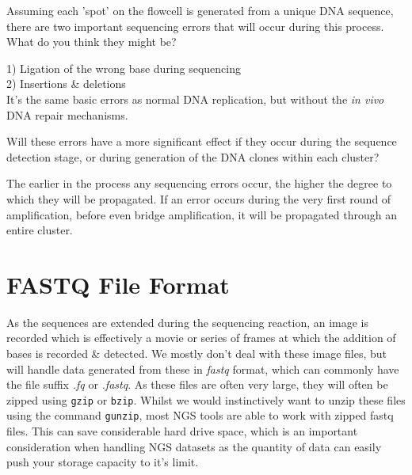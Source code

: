 \begin{questions}
Assuming each 'spot' on the flowcell is generated from a unique DNA sequence, there are two important sequencing errors that will occur during this process.
What do you think they might be? \\
\begin{answer}
1) Ligation of the wrong base during sequencing \\
2) Insertions \& deletions \\
It's the same basic errors as normal DNA replication, but without the \textit{in vivo} DNA repair mechanisms.
\end{answer}

Will these errors have a more significant effect if they occur during the sequence detection stage, or during generation of the DNA clones within each cluster? \\
\begin{answer}
The earlier in the process any sequencing errors occur, the higher the degree to which they will be propagated.
If an error occurs during the very first round of amplification, before even bridge amplification, it will be propagated through an entire cluster. \\
\end{answer}
\end{questions}

\section{FASTQ File Format}
\begin{note}
As the sequences are extended during the sequencing reaction, an image is recorded which is effectively a movie or series of frames at which the addition of bases is recorded \& detected.
We mostly don't deal with these image files, but will handle data generated from these in \textit{fastq} format, which can commonly have the file suffix \textit{.fq} or \textit{.fastq}.
As these files are often very large, they will often be zipped using \texttt{gzip} or \texttt{bzip}.
Whilst we would instinctively want to unzip these files using the command \texttt{gunzip}, most NGS tools are able to work with zipped fastq files.
This can save considerable hard drive space, which is an important consideration when handling NGS datasets as the quantity of data can easily push your storage capacity to it's limit. \\
\end{note}

